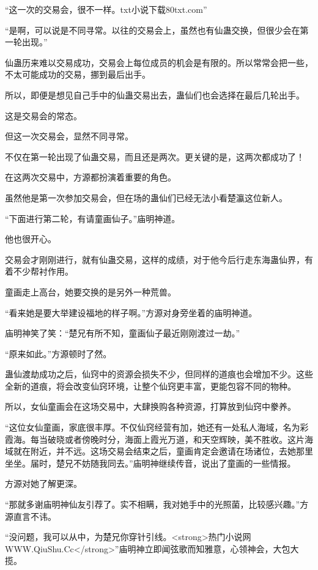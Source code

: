 
\begin{this_body}

“这一次的交易会，很不一样。txt小说下载80txt.com”

“是啊，可以说是不同寻常。以往的交易会上，虽然也有仙蛊交换，但很少会在第一轮出现。”

仙蛊历来难以交易成功，交易会上每位成员的机会是有限的。所以常常会把一些，不太可能成功的交易，挪到最后出手。

所以，即便是想见自己手中的仙蛊交易出去，蛊仙们也会选择在最后几轮出手。

这是交易会的常态。

但这一次交易会，显然不同寻常。

不仅在第一轮出现了仙蛊交易，而且还是两次。更关键的是，这两次都成功了！

在这两次交易中，方源都扮演着重要的角色。

虽然他是第一次参加交易会，但在场的蛊仙们已经无法小看楚瀛这位新人。

“下面进行第二轮，有请童画仙子。”庙明神道。

他也很开心。

交易会才刚刚进行，就有仙蛊交易，这样的成绩，对于他今后行走东海蛊仙界，有着不少帮衬作用。

童画走上高台，她要交换的是另外一种荒兽。

“看来她是要大举建设福地的样子啊。”方源对身旁坐着的庙明神道。

庙明神笑了笑：“楚兄有所不知，童画仙子最近刚刚渡过一劫。”

“原来如此。”方源顿时了然。

蛊仙渡劫成功之后，仙窍中的资源会损失不少，但同样的道痕也会增加不少。这些全新的道痕，将会改变仙窍环境，让整个仙窍更丰富，更能包容不同的物种。

所以，女仙童画会在这场交易中，大肆换购各种资源，打算放到仙窍中豢养。

“这位女仙童画，家底很丰厚。不仅仙窍经营有加，她还有一处私人海域，名为彩霞海。每当破晓或者傍晚时分，海面上霞光万道，和天空辉映，美不胜收。这片海域就在附近，并不远。这场交易会结束之后，童画肯定会邀请在场诸位，去她那里坐坐。届时，楚兄不妨随我同去。”庙明神继续传音，说出了童画的一些情报。

方源对她了解更深。

“那就多谢庙明神仙友引荐了。实不相瞒，我对她手中的光照菌，比较感兴趣。”方源直言不讳。

“没问题，我可以从中，为楚兄你穿针引线。<strong>热门小说网WWW.QiuShu.Cc</strong>”庙明神立即闻弦歌而知雅意，心领神会，大包大揽。


\end{this_body}

